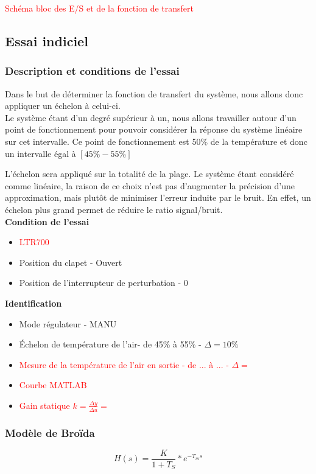 \textcolor{red}{Schéma bloc des E/S et de la fonction de transfert}

\subsection{Essai indiciel}
\subsubsection{Description et conditions de l'essai}
Dans le but de déterminer la fonction de transfert du système, nous allons donc appliquer un échelon à celui-ci.\\

Le système étant d'un degré supérieur à un, nous allons travailler autour d'un point de fonctionnement pour pouvoir considérer la réponse du système linéaire sur cet intervalle. Ce point de fonctionnement est 50\% de la température et donc un intervalle égal à $[45\% - 55\%]$

L'échelon sera appliqué sur la totalité de la plage. Le système étant considéré comme linéaire, la raison de ce choix n'est pas d'augmenter la précision d'une approximation, mais plutôt de minimiser l'erreur induite par le bruit. En effet, un échelon plus grand permet de réduire le ratio signal/bruit.\\

\textbf{Condition de l'essai}
\begin{itemize}
\item \textcolor{red}{LTR700}
\item Position du clapet - Ouvert
\item Position de l'interrupteur de perturbation - 0
\end{itemize}

\textbf{Identification}
\begin{itemize}
\item Mode régulateur - MANU
\item Échelon de température de l'air- de 45\% à 55\% - $\Delta = 10\%$
\item \textcolor{red}{Mesure de la température de l'air en sortie - de ... à ... - $\Delta =$}  

\item \textcolor{red}{Courbe MATLAB}

\item \textcolor{red}{Gain statique $k = \frac{\Delta y}{\Delta u} = $}
\end{itemize}

\subsubsection{Modèle de Broïda}
\begin{equation}
H(s) = \frac{K}{1 + T_{S}}*e^{-T_{m}s}
\end{equation}

